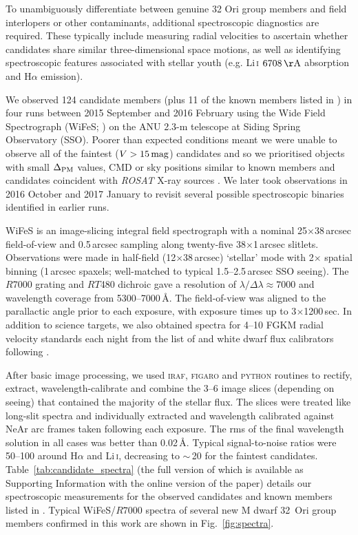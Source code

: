 \documentclass[usenatbib]{mnras}
\begin{document}
To unambiguously differentiate between genuine 32 Ori group members
and field interlopers or other contaminants, additional spectroscopic
diagnostics are required. These typically include measuring radial
velocities to ascertain whether candidates share similar
three-dimensional space motions, as well as identifying spectroscopic
features associated with stellar youth (e.g. Li\,\textsc{i}
$6708\,\rm{\AA}$ absorption and H$\alpha$ emission).

We observed 124 candidate members (plus 11 of the known members listed in
\citealp{Bell15}) in four runs between 2015 September and 2016
February using the Wide Field Spectrograph (WiFeS; \citealp{Dopita07})
on the ANU 2.3-m telescope at Siding Spring Observatory (SSO). Poorer than
expected conditions meant we were unable to observe all of the
faintest ($V>15\,\rm{mag}$) candidates and so we prioritised
objects with small $\Delta_{\rm PM}$ values, CMD or sky positions
similar to known members and candidates coincident with \emph{ROSAT}
X-ray sources \citep{Voges99}. We later took observations 
in 2016 October and 2017 January to revisit several possible spectroscopic binaries
identified in earlier runs.

WiFeS is an image-slicing integral field spectrograph with a nominal
25$\times$38\,arcsec field-of-view and 0.5\,arcsec sampling along
twenty-five 38$\times$1\,arcsec slitlets. Observations were made in
half-field (12$\times$38\,arcsec) `stellar' mode with 2$\times$
spatial binning (1\,arcsec spaxels; well-matched to typical
1.5--2.5\,arcsec SSO seeing). The $R$7000 grating and $RT$480 dichroic
gave a resolution of $\lambda/\Delta\lambda\approx7000$ and wavelength
coverage from 5300--7000\,\AA. The field-of-view was aligned to the
parallactic angle prior to each exposure, with exposure times up to
3$\times$1200\,sec. In addition to science targets, we also obtained
spectra for 4--10 FGKM radial velocity standards each night from the
list of \citet{Nidever02} and white dwarf flux calibrators following
\citet{Bessell99}.

After basic image processing, we used \textsc{iraf}, \textsc{figaro}
and \textsc{python} routines to rectify, extract, wavelength-calibrate
and combine the 3--6 image slices (depending on seeing) that contained
the majority of the stellar flux. The slices were treated like
long-slit spectra and individually extracted and wavelength calibrated
against NeAr arc frames taken following each exposure. The rms of the
final wavelength solution in all cases was better than
0.02\,\AA. Typical signal-to-noise ratios were 50--100 around
H$\alpha$ and Li\,\textsc{i}, decreasing to $\sim$\,20 for the
faintest candidates. Table~\ref{tab:candidate_spectra} (the full
version of which is available as Supporting Information with the
online version of the paper) details our
spectroscopic measurements for the observed candidates and 
known members listed in \cite{Bell15}. Typical WiFeS/$R7000$ spectra
of several new M dwarf 32~Ori group members confirmed in this work are
shown in Fig.~\ref{fig:spectra}.
\end{document}
